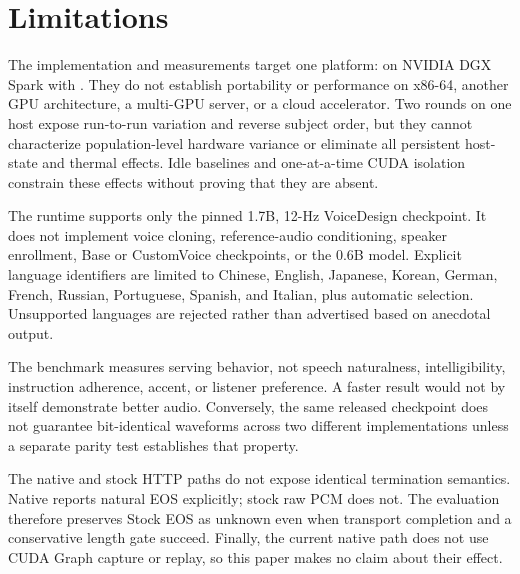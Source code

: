 \section{Limitations}

\label{sec:limitations}

The implementation and measurements target one platform:
 on NVIDIA DGX Spark with . They do not
establish portability or performance on x86-64, another GPU architecture, a
multi-GPU server, or a cloud accelerator. Two rounds on one host expose
run-to-run variation and reverse subject order, but they cannot characterize
population-level hardware variance or eliminate all persistent host-state and
thermal effects. Idle baselines and one-at-a-time CUDA isolation constrain
these effects without proving that they are absent.

The runtime supports only the pinned 1.7B, 12-Hz VoiceDesign checkpoint. It
does not implement voice cloning, reference-audio conditioning, speaker
enrollment, Base or CustomVoice checkpoints, or the 0.6B model. Explicit
language identifiers are limited to Chinese, English, Japanese, Korean,
German, French, Russian, Portuguese, Spanish, and Italian, plus automatic
selection. Unsupported languages are rejected rather than advertised based on
anecdotal output.

The benchmark measures serving behavior, not speech naturalness,
intelligibility, instruction adherence, accent, or listener preference. A
faster result would not by itself demonstrate better audio. Conversely, the
same released checkpoint does not guarantee bit-identical waveforms across two
different implementations unless a separate parity test establishes that
property.

The native and stock HTTP paths do not expose identical termination semantics.
Native reports natural EOS explicitly; stock raw PCM does not. The evaluation
therefore preserves Stock EOS as unknown even when transport completion and a
conservative length gate succeed. Finally, the current native path does not use
CUDA Graph capture or replay, so this paper makes no claim about their effect.
